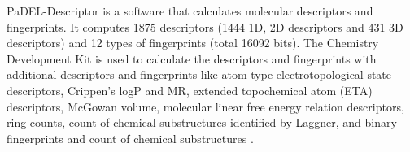 PaDEL-Descriptor is a software that calculates molecular descriptors and fingerprints. It computes 1875 descriptors (1444 1D, 2D descriptors and 431 3D descriptors) and 12 types of fingerprints (total 16092 bits). The Chemistry Development Kit is used to calculate the descriptors and fingerprints with additional descriptors and fingerprints like atom type electrotopological state descriptors, Crippen's logP and MR, extended topochemical atom (ETA) descriptors, McGowan volume, molecular linear free energy relation descriptors, ring counts, count of chemical substructures identified by Laggner, and binary fingerprints and count of chemical substructures \cite{Yap_2010}.